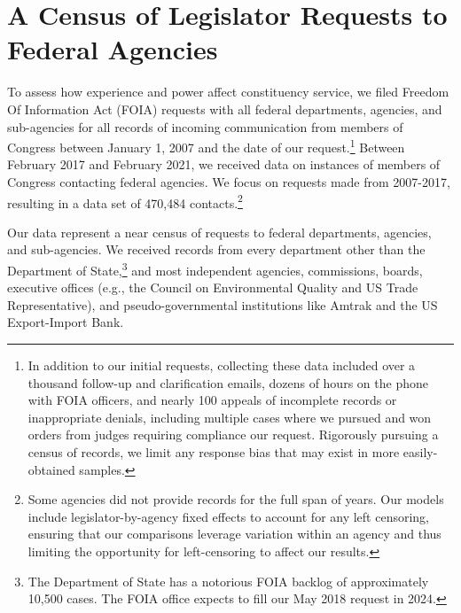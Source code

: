 \documentclass[12pt]{article}
\begin{document}
\section{A Census of Legislator Requests to Federal Agencies} \label{s:data}
To assess how experience and power affect constituency service, we filed   Freedom Of Information Act (FOIA) requests with all federal departments, agencies, and sub-agencies for all records of incoming communication from members of Congress between January 1, 2007 and the date of our request.\footnote{In addition to our initial requests, collecting these data included over a thousand follow-up and clarification emails, dozens of hours on the phone with FOIA officers, and nearly 100 appeals of incomplete records or inappropriate denials, including multiple cases where we pursued and won orders from judges requiring compliance our request. Rigorously pursuing a census of records, we limit any response bias that may exist in more easily-obtained samples.} Between February 2017 and February 2021, we received data on  instances of members of Congress contacting federal agencies. We focus on requests made from 2007-2017, resulting in a data set of 470,484 contacts.\footnote{Some agencies did not provide records for the full span of years. Our models include legislator-by-agency fixed effects to account for any left censoring, ensuring that our comparisons leverage variation within an agency and thus limiting the opportunity for left-censoring to affect our results.}  %

Our data represent a near census of requests to federal departments, agencies, and sub-agencies. We received records from every department other than the Department of State,\footnote{The Department of State has a notorious FOIA backlog of approximately 10,500 cases. The FOIA office expects to fill our May 2018 request in 2024.} and most independent agencies, commissions, boards, executive offices (e.g., the Council on Environmental Quality and US Trade Representative), and pseudo-governmental institutions like Amtrak and the US Export-Import Bank. 
\end{document}
